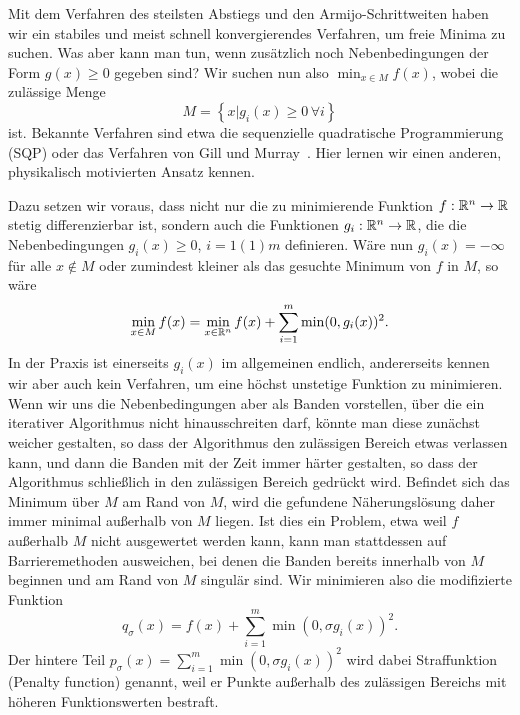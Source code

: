 Mit dem Verfahren des steilsten Abstiegs und den Armijo-Schrittweiten
haben wir ein stabiles und meist schnell konvergierendes Verfahren, um
freie Minima zu suchen. Was aber kann man tun, wenn zusätzlich noch
Nebenbedingungen der Form $g(x)\ge 0$ gegeben sind? Wir suchen nun
also $\min_{x\in M} f(x)$, wobei die zulässige Menge
\begin{equation}
  M=\left\{ x | g_i(x)\ge 0\, \forall i \right\}
\end{equation}
ist. Bekannte Verfahren sind etwa die sequenzielle quadratische
Programmierung (SQP) oder das Verfahren von Gill und
Murray~\cite{gill78a}. Hier lernen wir einen anderen, physikalisch
motivierten Ansatz kennen.

Dazu setzen wir voraus, dass nicht nur die zu minimierende Funktion
$f:\mathbb{R}^n\to\mathbb{R}$ stetig differenzierbar ist, sondern auch die
Funktionen $g_i:\mathbb{R}^n\to\mathbb{R}$, die die Nebenbedingungen $g_i(x)\ge 0$,
$i=1(1)m$ definieren. Wäre nun $g_i(x)=-\infty$ für alle $x\notin M$
oder zumindest kleiner als das gesuchte Minimum von $f$ in $M$, so
wäre
\begin{equation}
  \min_{x\in M} f(x) = \min_{x\in\mathbb{R}^n} f(x) + \sum_{i=1}^m \min(0,
  g_i(x))^2.
\end{equation}
In der Praxis ist einerseits $g_i(x)$ im allgemeinen endlich,
andererseits kennen wir aber auch kein Verfahren, um eine höchst
unstetige Funktion zu minimieren. Wenn wir uns die Nebenbedingungen
aber als Banden vorstellen, über die ein iterativer Algorithmus nicht
hinausschreiten darf, könnte man diese zunächst weicher gestalten, so
dass der Algorithmus den zulässigen Bereich etwas verlassen kann, und
dann die Banden mit der Zeit immer härter gestalten, so dass der
Algorithmus schließlich in den zulässigen Bereich gedrückt
wird. Befindet sich das Minimum über $M$ am Rand von $M$, wird die
gefundene Näherungslösung daher immer minimal außerhalb von $M$
liegen. Ist dies ein Problem, etwa weil $f$ außerhalb $M$ nicht
ausgewertet werden kann, kann man stattdessen auf Barrieremethoden
ausweichen, bei denen die Banden bereits innerhalb von $M$ beginnen
und am Rand von $M$ singulär sind.  Wir minimieren also die
modifizierte Funktion
\begin{equation}
  \label{eq:penalty}
  q_{\sigma}(x) = f(x) + \sum_{i=1}^m \min(0,
  \sigma g_i(x))^2.
\end{equation}
Der hintere Teil $p_{\sigma}(x) = \sum_{i=1}^m \min(0, \sigma
g_i(x))^2$ wird dabei Straffunktion (Penalty function)
genannt, weil er Punkte außerhalb des zulässigen Bereichs mit höheren
Funktionswerten bestraft.

